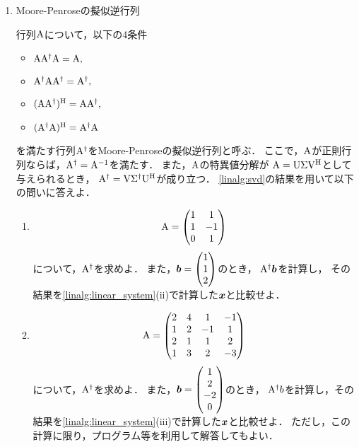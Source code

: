 \begin{enumerate}[label=問\arabic*.]
  \item Moore-Penroseの擬似逆行列

  \vspace{1mm}
  行列$\mathrm{A}$について，以下の4条件
  \begin{itemize}
    \item $\mathrm{A}\mathrm{A}^\dagger\mathrm{A}=\mathrm{A},$
    \item $\mathrm{A}^\dagger\mathrm{A}\mathrm{A}^\dagger=\mathrm{A}^\dagger,$
    \item $(\mathrm{A}\mathrm{A}^\dagger)^\mathrm{H}=\mathrm{A}\mathrm{A}^\dagger,$
    \item $(\mathrm{A}^\dagger\mathrm{A})^\mathrm{H}=\mathrm{A}^\dagger\mathrm{A}$
  \end{itemize}
  を満たす行列$\mathrm{A}^\dagger$をMoore-Penroseの擬似逆行列と呼ぶ．
  ここで，$\mathrm{A}$が正則行列ならば，$\mathrm{A}^\dagger=\mathrm{A}^{-1}$を満たす．
  また，$\mathrm{A}$の特異値分解が
  $\mathrm{A}=\mathrm{U}\mathrm{\Sigma}\mathrm{V}^\mathrm{H}$として与えられるとき，
  $\mathrm{A}^\dagger=\mathrm{V}\mathrm{\Sigma}^\dagger\mathrm{U}^\mathrm{H}$が成り立つ．
  \ref{linalg:svd}の結果を用いて以下の問いに答えよ．
  \begin{enumerate}[label=(\roman*)]
    \item
      \begin{equation}
        \mathrm{A} =
          \begin{pmatrix}
            1 & 1 \\
            1 & -1 \\
            0 & 1
          \end{pmatrix}
      \end{equation}
      について，$\mathrm{A}^\dagger$を求めよ．
      また，$\boldsymbol{b} = \begin{pmatrix} 1 \\ 1 \\ 2 \end{pmatrix}$のとき，
      $\mathrm{A}^\dagger \boldsymbol{b}$を計算し，
      その結果を\ref{linalg:linear_system}(ii)で計算した$\boldsymbol{x}$と比較せよ．
  
    \item
      \begin{equation}
        \mathrm{A} =
          \begin{pmatrix}
            2 & 4 & 1 & -1 \\
            1 & 2 & -1 & 1 \\
            2 & 1 & 1 & 2 \\
            1 & 3 & 2 & -3
          \end{pmatrix}
      \end{equation}
      について，$\mathrm{A}^\dagger$を求めよ．
      また，$\boldsymbol{b}=\begin{pmatrix} 1 \\ 2 \\ -2 \\ 0 \end{pmatrix}$のとき，
      $\mathrm{A}^\dagger b$を計算し，その結果を\ref{linalg:linear_system}(iii)で計算した$\boldsymbol{x}$と比較せよ．
      ただし，この計算に限り，プログラム等を利用して解答してもよい．
  \end{enumerate}


\end{enumerate}
